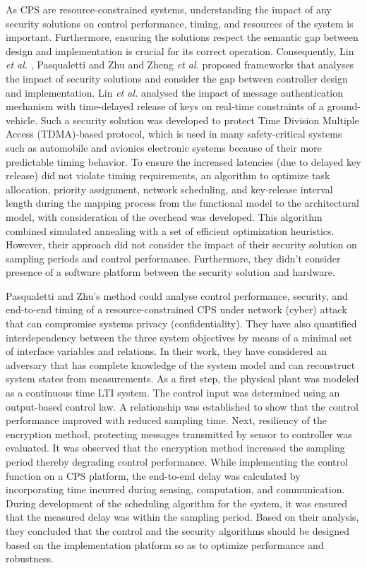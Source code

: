 
As CPS are resource-constrained systems, understanding the impact of any security solutions on  control performance, timing, and resources of the system is important. Furthermore, ensuring the solutions respect the semantic gap between design and implementation is crucial for its correct operation. Consequently, Lin \textit{et al.} \cite{LZV14}, Pasqualetti and Zhu \cite{PZ15} and Zheng \textit{et al.} \cite{ZDRP16} proposed frameworks that analyses the impact of security solutions and consider the gap between controller design and implementation. Lin \textit{et al.} \cite{LZV14} analysed the impact of message authentication mechanism with time-delayed release of keys on real-time constraints of a ground-vehicle. Such a security solution was developed to protect Time Division Multiple Access (TDMA)-based protocol, which is used in many safety-critical systems such as automobile and avionics electronic systems because of their more predictable timing behavior. To ensure the increased latencies (due to delayed key release) did not violate timing requirements, an algorithm to optimize task allocation, priority assignment, network scheduling, and key-release interval length during the mapping process from the functional model to the architectural model, with consideration of the overhead was developed. This algorithm combined simulated annealing with a set of efficient optimization heuristics. However, their approach did not consider the impact of their security solution on sampling periods and control performance. Furthermore, they didn't consider presence of a software platform between the security solution and hardware.     


Pasqualetti and Zhu's \cite{PZ15} method could analyse control performance, security, and end-to-end timing of a resource-constrained CPS under network (cyber) attack that can compromise systems privacy (confidentiality). They have also quantified interdependency between the three system objectives by means of a minimal set of interface variables and relations. In their work, they have considered an adversary that has complete knowledge of the system model and can reconstruct system states from measurements. As a first step, the physical plant was modeled as a continuous time LTI system. The control input was determined using an output-based control law. A relationship was established to show that the control performance improved with reduced sampling time. Next, resiliency of the encryption method, protecting messages transmitted by sensor to controller was evaluated. It was observed that the encryption method increased the sampling period thereby degrading control performance. While implementing the control function on a CPS platform, the end-to-end delay was calculated by incorporating time incurred during sensing, computation, and communication. During development of the scheduling algorithm for the system, it was ensured that the measured delay was within the sampling period. Based on their analysis, they concluded that the control and the security algorithms should be designed based on the implementation platform so as to optimize performance and robustness. 

